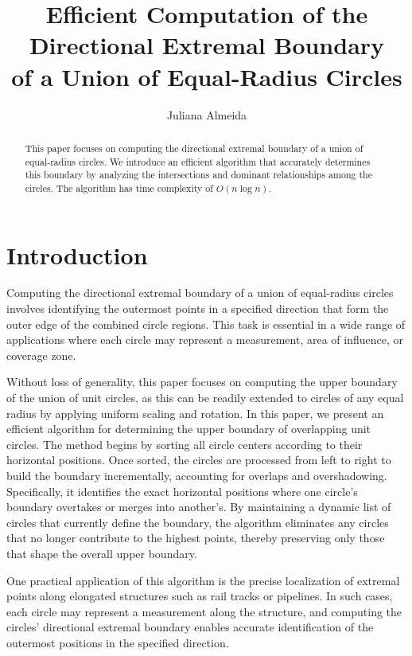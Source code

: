 \documentclass[12pt]{article}
\title{Efficient Computation of the Directional Extremal Boundary\\of a Union of Equal-Radius Circles}
\author{Juliana Almeida\inst{1}}
\begin{document}
\maketitle

\begin{abstract}
This paper focuses on computing the directional extremal boundary
of a union of equal-radius circles. We introduce an efficient algorithm
that accurately determines this boundary by analyzing the intersections and
dominant relationships among the circles. The algorithm has time complexity
of $O(n \log n)$.
\end{abstract}

\section{Introduction}

Computing the directional extremal boundary of a union of equal-radius circles involves
identifying the outermost points in a specified direction that form the outer edge of the
combined circle regions. This task is essential in a wide range of applications where each
circle may represent a measurement, area of influence, or coverage zone.

Without loss of generality, this paper focuses on computing the upper boundary of
the union of unit circles, as this can be readily extended to circles of any equal radius by
applying uniform scaling and rotation. In this paper, we present an efficient algorithm for
determining the upper boundary of overlapping unit circles. The method begins by sorting
all circle centers according to their horizontal positions. Once sorted, the circles are
processed from left to right to build the boundary incrementally, accounting for overlaps
and overshadowing. Specifically, it identifies the exact horizontal positions where one
circle's boundary overtakes or merges into another's. By maintaining a dynamic list of
circles that currently define the boundary, the algorithm eliminates any circles that no
longer contribute to the highest points, thereby preserving only those that shape the overall
upper boundary.

One practical application of this algorithm is the precise localization of extremal
points along elongated structures such as rail tracks or pipelines. In such cases, each
circle may represent a measurement along the structure, and computing the circles'
directional extremal boundary enables accurate identification of the outermost positions
in the specified direction.
\end{document}
